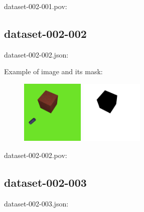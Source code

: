 dataset-002-001.pov:
\begin{scriptsize}
\begin{ttfamily}

\end{ttfamily}
\end{scriptsize}

\subsection{dataset-002-002}

dataset-002-002.json:
\begin{scriptsize}
\begin{ttfamily}

\end{ttfamily}
\end{scriptsize}

Example of image and its mask:
\begin{center}
\begin{figure}[H]
\centering\includegraphics[width=3cm]{./img-002-002.png}
\centering\includegraphics[width=3cm]{./mask-002-002.png}
\end{figure}
\end{center}

dataset-002-002.pov:
\begin{scriptsize}
\begin{ttfamily}

\end{ttfamily}
\end{scriptsize}

\subsection{dataset-002-003}

dataset-002-003.json:
\begin{scriptsize}
\begin{ttfamily}

\end{ttfamily}
\end{scriptsize}

